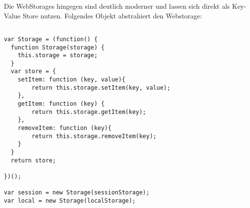 \documentclass[12pt, a4paper]{article}
\begin{document}
Die WebStorages hingegen sind deutlich moderner und lassen sich direkt als Key-Value Store nutzen. Folgendes Objekt abstrahiert den Webstorage:

\begin{lstlisting}
 
var Storage = (function() {
  function Storage(storage) {
    this.storage = storage;
  }
  var store = {
	setItem: function (key, value){
		return this.storage.setItem(key, value);
	},
	getItem: function (key) {
		return this.storage.getItem(key);
	},
	removeItem: function (key){
		return this.storage.removeItem(key);
	}
  }
  return store;

})();

var session = new Storage(sessionStorage);
var local = new Storage(localStorage);
\end{lstlisting}
\end{document}
